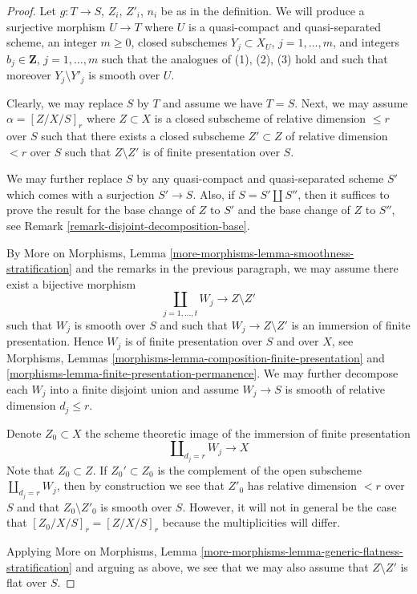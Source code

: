 \begin{proof}
Let $g : T \to S$, $Z_i$, $Z'_i$, $n_i$ be as in the definition.
We will produce a surjective morphism $U \to T$ where $U$ is
a quasi-compact and quasi-separated scheme, an integer
$m \geq 0$, closed subschemes $Y_j \subset X_U$, $j = 1, \ldots, m$,
and integers $b_j \in \mathbf{Z}$, $j = 1, \ldots, m$ such that
the analogues of (1), (2), (3) hold and such that moreover
$Y_j \setminus Y'_j$ is smooth over $U$.

\medskip\noindent
Clearly, we may replace $S$ by $T$ and assume we have $T = S$.
Next, we may assume $\alpha = [Z/X/S]_r$ where $Z \subset X$ is
a closed subscheme of relative dimension $\leq r$ over $S$
such that there exists a closed subscheme $Z' \subset Z$
of relative dimension $< r$ over $S$ such that
$Z \setminus Z'$ is of finite presentation over $S$.

\medskip\noindent
We may further replace $S$ by any quasi-compact and quasi-separated
scheme $S'$ which comes with a surjection $S' \to S$. Also, if
$S = S' \amalg S''$, then it suffices to prove the result for
the base change of $Z$ to $S'$ and the base change of $Z$ to $S''$, see
Remark \ref{remark-disjoint-decomposition-base}.

\medskip\noindent
By More on Morphisms, Lemma
\ref{more-morphisms-lemma-smoothness-stratification}
and the remarks in the previous paragraph,
we may assume there exist a bijective morphism
$$
\coprod_{j = 1, \ldots, t} W_j \to Z \setminus Z'
$$
such that $W_j$ is smooth over $S$ and such that $W_j \to Z \setminus Z'$
is an immersion of finite presentation. Hence $W_j$ is of
finite presentation over $S$ and over $X$, see
Morphisms, Lemmas \ref{morphisms-lemma-composition-finite-presentation} and
\ref{morphisms-lemma-finite-presentation-permanence}.
We may further decompose each $W_j$ into a finite disjoint union
and assume $W_j \to S$ is smooth of relative dimension $d_j \leq r$.

\medskip\noindent
Denote $Z_0 \subset X$ the scheme theoretic image of the immersion
of finite presentation
$$
\coprod\nolimits_{d_j = r} W_j \longrightarrow X
$$
Note that $Z_0 \subset Z$. If $Z_0' \subset Z_0$ is the complement
of the open subscheme $\coprod_{d_j = r} W_j$, then by construction
we see that $Z'_0$ has relative
dimension $< r$ over $S$ and that $Z_0 \setminus Z'_0$ is smooth
over $S$. However, it will not in general be the case that
$[Z_0/X/S]_r = [Z/X/S]_r$ because the multiplicities will differ.

\medskip\noindent
Applying More on Morphisms, Lemma
\ref{more-morphisms-lemma-generic-flatness-stratification}
and arguing as above, we see that we may also assume that
$Z \setminus Z'$ is flat over $S$.



\end{proof}














